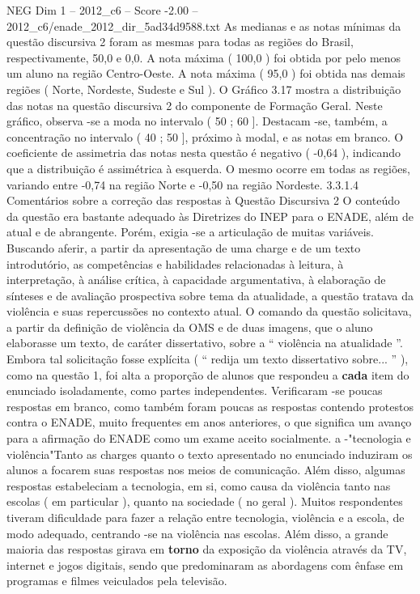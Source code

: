 \begin{textsample}{NEG Dim 1 – 2012\_c6 – Score -2.00 – 2012\_c6/enade\_2012\_dir\_5ad34d9588.txt}
As medianas e as notas mínimas da questão discursiva 2 foram as mesmas para todas as regiões do Brasil, respectivamente, 50,0 e 0,0.
A nota máxima ( 100,0 ) foi obtida por pelo menos um aluno na região Centro-Oeste.
A nota máxima ( 95,0 ) foi obtida nas demais regiões ( Norte, Nordeste, Sudeste e Sul ).
O Gráfico 3.17 mostra a distribuição das notas na questão discursiva 2 do componente de Formação Geral.
Neste gráfico, observa -se a moda no intervalo ( 50 ; 60 ].
Destacam -se, também, a concentração no intervalo ( 40 ; 50 ], próximo à modal, e as notas em branco.
O coeficiente de assimetria das notas nesta questão é negativo ( -0,64 ), indicando que a distribuição é assimétrica à esquerda.
O mesmo ocorre em todas as regiões, variando entre -0,74 na região Norte e -0,50 na região Nordeste. 3.3.1.4 Comentários sobre a correção das respostas à Questão Discursiva 2 O conteúdo da questão era bastante adequado às Diretrizes do INEP para o ENADE, além de atual e de abrangente.
Porém, exigia -se a articulação de muitas variáveis.
Buscando aferir, a partir da apresentação de uma charge e de um texto introdutório, as competências e habilidades relacionadas à leitura, à interpretação, à análise crítica, à capacidade argumentativa, à elaboração de sínteses e de avaliação prospectiva sobre tema da atualidade, a questão tratava da violência e suas repercussões no contexto atual.
O comando da questão solicitava, a partir da definição de violência da OMS e de duas imagens, que o aluno elaborasse um texto, de caráter dissertativo, sobre a “ violência na atualidade ”.
Embora tal solicitação fosse explícita ( “ redija um texto dissertativo sobre... ” ), como na questão 1, foi alta a proporção de alunos que respondeu a \textbf{cada} item do enunciado isoladamente, como partes independentes.
Verificaram -se poucas respostas em branco, como também foram poucas as respostas contendo protestos contra o ENADE, muito frequentes em anos anteriores, o que significa um avanço para a afirmação do ENADE como um exame aceito socialmente. a -"tecnologia e violência"Tanto as charges quanto o texto apresentado no enunciado induziram os alunos a focarem suas respostas nos meios de comunicação.
Além disso, algumas respostas estabeleciam a tecnologia, em si, como causa da violência tanto nas escolas ( em particular ), quanto na sociedade ( no geral ).
Muitos respondentes tiveram dificuldade para fazer a relação entre tecnologia, violência e a escola, de modo adequado, centrando -se na violência nas escolas.
Além disso, a grande maioria das respostas girava em \textbf{torno} da exposição da violência através da TV, internet e jogos digitais, sendo que predominaram as abordagens com ênfase em programas e filmes veiculados pela televisão.

\end{textsample}
